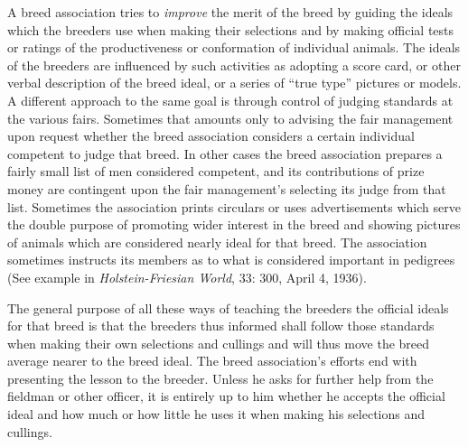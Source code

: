 A breed association tries to \textit{improve} the merit of the breed by guiding the ideals which the breeders use when making their 
selections and by making official tests or ratings of the productiveness or conformation of individual animals. The ideals 
of the breeders are influenced by such activities as adopting a score card, or other verbal description of the breed ideal, 
or a series of ``true type'' pictures or models. A different approach to the same goal is through control of judging 
standards at the various fairs. Sometimes that amounts only to advising the fair management upon request whether the breed 
association considers a certain individual competent to judge that breed. In other cases the breed association prepares a 
fairly small list of men considered competent, and its contributions of prize money are contingent upon the fair management's
selecting its judge from that list. Sometimes the association prints circulars or uses advertisements which serve the 
double purpose of promoting wider interest in the breed and showing pictures of animals which are considered nearly ideal 
for that breed. The association sometimes instructs its members as to what is considered important in pedigrees (See 
example in \textit{Holstein-Friesian World}, 33: 300, April 4, 1936).

The general purpose of all these ways of teaching the breeders the official ideals for that breed is that the breeders thus 
informed shall follow those standards when making their own selections and cullings and will thus move the breed average 
nearer to the breed ideal. The breed association's efforts end with presenting the lesson to the breeder. Unless he asks 
for further help from the fieldman or other officer, it is entirely up to him whether he accepts the official ideal and how 
much or how little he uses it when making his selections and cullings.

